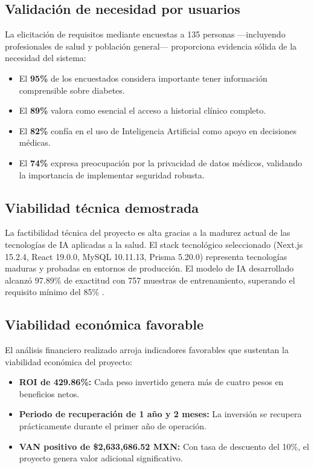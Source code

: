 \documentclass[12pt, letterpaper, twoside]{report}
\begin{document}
\subsection{Validación de necesidad por usuarios}

La elicitación de requisitos mediante encuestas a 135 personas —incluyendo profesionales de salud y población general— proporciona evidencia sólida de la necesidad del sistema:

\begin{itemize}[leftmargin=1.5cm]
  \item El \textbf{95\%} de los encuestados considera importante tener información comprensible sobre diabetes.
  \item El \textbf{89\%} valora como esencial el acceso a historial clínico completo.
  \item El \textbf{82\%} confía en el uso de Inteligencia Artificial como apoyo en decisiones médicas.
  \item El \textbf{74\%} expresa preocupación por la privacidad de datos médicos, validando la importancia de implementar seguridad robusta.
\end{itemize}

\subsection{Viabilidad técnica demostrada}

La factibilidad técnica del proyecto es alta gracias a la madurez actual de las tecnologías de IA aplicadas a la salud. El stack tecnológico seleccionado (Next.js 15.2.4, React 19.0.0, MySQL 10.11.13, Prisma 5.20.0) representa tecnologías maduras y probadas en entornos de producción. El modelo de IA desarrollado alcanzó 97.89\% de exactitud con 757 muestras de entrenamiento, superando el requisito mínimo del 85\% \citep{beam2018, rodriguez2019}.

\subsection{Viabilidad económica favorable}

El análisis financiero realizado arroja indicadores favorables que sustentan la viabilidad económica del proyecto:

\begin{itemize}[leftmargin=1.5cm]
  \item \textbf{ROI de 429.86\%:} Cada peso invertido genera más de cuatro pesos en beneficios netos.
  \item \textbf{Periodo de recuperación de 1 año y 2 meses:} La inversión se recupera prácticamente durante el primer año de operación.
  \item \textbf{VAN positivo de \$2{,}633{,}686.52 MXN:} Con tasa de descuento del 10\%, el proyecto genera valor adicional significativo.
\end{itemize}
\end{document}
